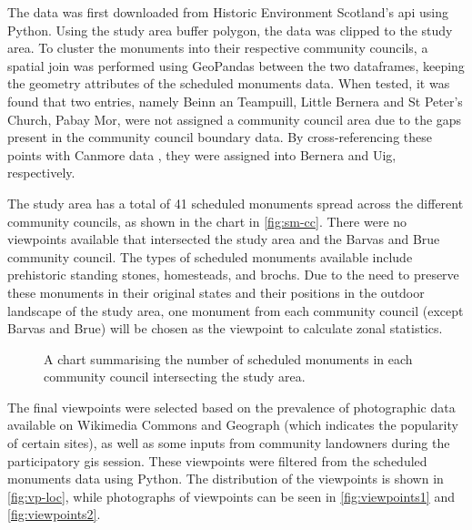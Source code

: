 The data was first downloaded from Historic Environment Scotland's \gls{api} using Python. Using the study area buffer polygon, the data was clipped to the study area. To cluster the monuments into their respective community councils, a spatial join was performed using GeoPandas between the two dataframes, keeping the geometry attributes of the scheduled monuments data. When tested, it was found that two entries, namely Beinn an Teampuill, Little Bernera and St Peter's Church, Pabay Mor, were not assigned a community council area due to the gaps present in the community council boundary data. By cross-referencing these points with Canmore data \autocite{canmore}, they were assigned into Bernera and Uig, respectively.

The study area has a total of 41 scheduled monuments spread across the different community councils, as shown in the chart in \autoref{fig:sm-cc}. There were no viewpoints available that intersected the study area and the Barvas and Brue community council. The types of scheduled monuments available include prehistoric standing stones, homesteads, and brochs. Due to the need to preserve these monuments in their original states and their positions in the outdoor landscape of the study area, one monument from each community council (except Barvas and Brue) will be chosen as the viewpoint to calculate zonal statistics.

\begin{figure}
  \centering
  \caption{A chart summarising the number of scheduled monuments in each community council intersecting the study area. \label{fig:sm-cc}}
\end{figure}

The final viewpoints were selected based on the prevalence of photographic data available on Wikimedia Commons and Geograph \autocite{wikimedia,geograph-uk} (which indicates the popularity of certain sites), as well as some inputs from community landowners during the participatory \gls{gis} session. These viewpoints were filtered from the scheduled monuments data using Python. The distribution of the viewpoints is shown in \autoref{fig:vp-loc}, while photographs of viewpoints can be seen in \autoref{fig:viewpoints1} and \autoref{fig:viewpoints2}.

